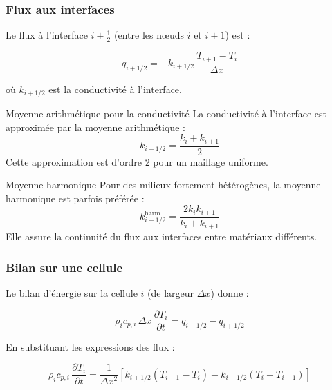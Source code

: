 \documentclass[11pt,a4paper]{article}
\begin{document}
\subsubsection{Flux aux interfaces}

Le flux à l'interface $i+\frac{1}{2}$ (entre les nœuds $i$ et $i+1$) est :

\begin{equation}
q_{i+1/2} = -k_{i+1/2} \, \frac{T_{i+1} - T_i}{\Delta x}
\end{equation}

où $k_{i+1/2}$ est la conductivité à l'interface.

\begin{hypothese}{Moyenne arithmétique pour la conductivité}{}
La conductivité à l'interface est approximée par la moyenne arithmétique :
\begin{equation}
k_{i+1/2} = \frac{k_i + k_{i+1}}{2}
\end{equation}
Cette approximation est d'ordre 2 pour un maillage uniforme.
\end{hypothese}

\begin{remarque}{Moyenne harmonique}{}
Pour des milieux fortement hétérogènes, la moyenne harmonique est parfois préférée :
\begin{equation}
k_{i+1/2}^{\text{harm}} = \frac{2 k_i k_{i+1}}{k_i + k_{i+1}}
\end{equation}
Elle assure la continuité du flux aux interfaces entre matériaux différents.
\end{remarque}

\subsubsection{Bilan sur une cellule}

Le bilan d'énergie sur la cellule $i$ (de largeur $\Delta x$) donne :

\begin{equation}
\rho_i c_{p,i} \, \Delta x \, \frac{\partial T_i}{\partial t} = q_{i-1/2} - q_{i+1/2}
\end{equation}

En substituant les expressions des flux :

\begin{equation}
\rho_i c_{p,i} \, \frac{\partial T_i}{\partial t} = \frac{1}{\Delta x^2} \left[ k_{i+1/2}(T_{i+1} - T_i) - k_{i-1/2}(T_i - T_{i-1}) \right]
\end{equation}
\end{document}
